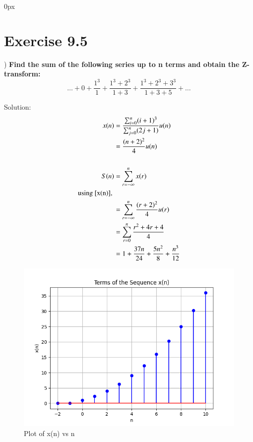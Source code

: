 \documentclass[journal,12pt,twocolumn]{IEEEtran}
\begin{document}
\parindent 0px


\vspace{3cm}

\title{}
\author{EE23BTECH11217 - Prajwal M$^{*}$
}
\maketitle
\newpage
\bigskip

\renewcommand{\thefigure}{\theenumi}
\renewcommand{\thetable}{\theenumi}

\section*{Exercise 9.5}
) \hspace{2pt} \textbf{Find the sum of the following series up to n terms and obtain the Z-transform:}
$$ 
\ldots + 0 + \frac{1^3}{1} + \frac{1^3 + 2^3}{1 + 3} + \frac{1^3 + 2^3 + 3^3}{1 + 3 + 5} + \ldots$$

\noindent Solution: 
\begin{align}
    x(n) & = \frac{\sum_{i=0}^{n} (i+1)^3}{\sum_{j=0}^{n} (2j+1)} u(n)  \\
    & = \frac{(n + 2)^2}{4} u(n) \label{x(n)}\\\notag\\
    S(n) & = \sum_{r=-\infty}^{n} x(r)\\
    \notag \text{using \eqref{x(n)}, } \\
    & = \sum_{r=-\infty}^{n} \frac{(r+2)^2}{4} u(r) \\
    & = \sum_{r=0}^{n}\frac{r^2 + 4r + 4}{4} \\
    & = 1 + \frac{37n}{24} + \frac{5n^2}{8} + \frac{n^3}{12}
\end{align}

\begin{figure}[h]
   \centering
   \includegraphics[width=1\columnwidth]{figs/plot.png}
   \caption{Plot of x(n) vs n}
   \label {fig: 11.9.5.25.1}
\end{figure}
\end{document}

